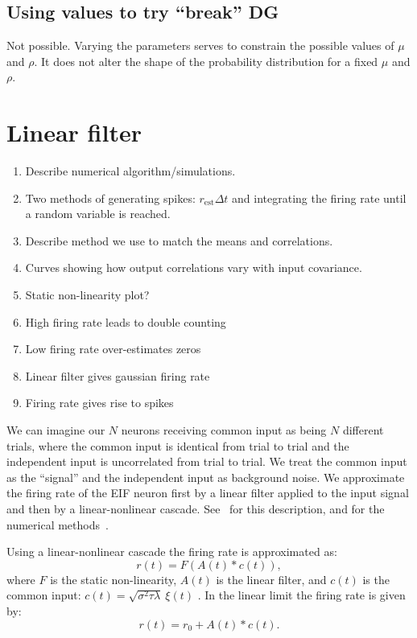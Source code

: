 \documentclass[11pt]{article}
\begin{document}
\subsection{Using values to try ``break'' DG}
Not possible. Varying the parameters serves to constrain the possible values of $\mu$ and $\rho$. It does not alter the shape of the probability distribution for a fixed $\mu$ and $\rho$.

\section{Linear filter}%
\begin{enumerate}
\item Describe numerical algorithm/simulations.
\item Two methods of generating spikes: $r_\text{est} \Delta t$ and integrating the firing rate until a random variable is reached.
\item Describe method we use to match the means and correlations.
\item Curves showing how output correlations vary with input covariance.
\item Static non-linearity plot?
\item High firing rate leads to double counting
\item Low firing rate over-estimates zeros
\item Linear filter gives gaussian firing rate
\item Firing rate gives rise to spikes 
\end{enumerate}


We can imagine our $N$ neurons receiving common input as being $N$ different trials, where the common input is identical from trial to trial and the independent input is uncorrelated from trial to trial. We treat the common input as the ``signal'' and the independent input as background noise. We approximate the firing rate of the EIF neuron first by a linear filter applied to the input signal and then by a linear-nonlinear cascade. See~\cite{Ostojic:2011kf} for this description, and for the numerical methods~\cite{Richardson:2007ct}.

Using a linear-nonlinear cascade the firing rate is approximated as:
\begin{equation}
r(t) = F\left(A(t) * c(t) \right),
\end{equation}
where $F$ is the static non-linearity, $A(t)$ is the linear filter, and $c(t)$ is the common input: $c(t) = \sqrt{\sigma^2 \tau \lambda}~\xi(t)$ . In the linear limit the firing rate is given by:
\begin{equation}
r(t) = r_0 + A(t) * c(t).
\end{equation} 
\end{document}
